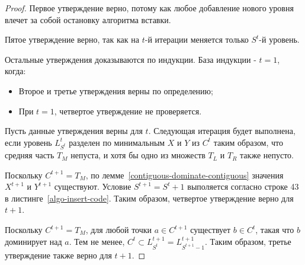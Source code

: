 \begin{proof}
Первое утверждение верно, потому как любое добавление нового уровня влечет за собой остановку 
алгоритма вставки.

Пятое утверждение верно, так как на $t$-й итерации меняется только $S^t$-й уровень.

Остальные утверждения доказываются по индукции. База индукции - $t = 1$, когда:
\begin{itemize}
    \item Второе и третье утверждения верны по определению;
    \item При $t = 1$, четвертое утверждение не проверяется.
\end{itemize}

Пусть данные утверждения верны для $t$.
Следующая итерация будет выполнена, если уровень $L_{S^t}^t$ разделен по минимальным
$X$ и $Y$ из $C^t$ таким образом, что средняя часть $T_M$ непуста, и хотя бы одно из
множеств $T_L$ и $T_R$ также непусто.

Поскольку $C^{t+1} = T_M$, по лемме~\ref{contiguous-dominate-contiguous} значения
$X^{t+1}$ и $Y^{t+1}$ существуют. Условие $S^{t+1} = S^t + 1$ выполяется согласно строке 43
в листинге~\ref{algo-insert-code}. Таким образом, четвертое утверждение верно для $t+1$.

Поскольку $C^{t+1} = T_M$, для любой точки $a \in C^{t+1}$ существует $b \in C^{t}$, такая что 
$b$ доминирует над $a$. Тем не менее, $C^{t} \subset L_{S^t}^{t+1} = L_{S^{t+1}-1}^{t+1}$.
Таким образом, третье утверждение также верно для $t+1$.


\end{proof}
